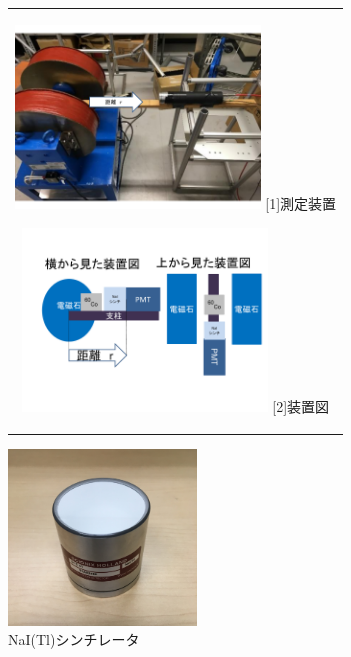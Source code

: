 \begin{figure}[h!]
  \begin{center}
    \begin{tabular}{c}
      \begin{minipage}[h]{0.5\hsize}    
        \begin{center}
          \includegraphics[width=6.5cm]{fig/iguchi/2inchsokutei.pdf}
	\hspace{2cm}[1]測定装置
     \end{center}
    \end{minipage}
      \begin{minipage}[h]{0.5\hsize}    
        \begin{center}
          \includegraphics[width=6.5cm]{fig/iguchi/soutizu1.pdf}
         \hspace{2cm}[2]装置図
         \end{center}
        \end{minipage}
     
     \end{tabular}
     \label{souchi}
    \end{center}
 \end{figure}

\begin{figure}[h]
	\centering
	\includegraphics[width=5cm]{fig/iguchi/NaIscinti.jpg}
	\caption{NaI(Tl)シンチレータ}
	\label{NaIscinti}
\end{figure}

